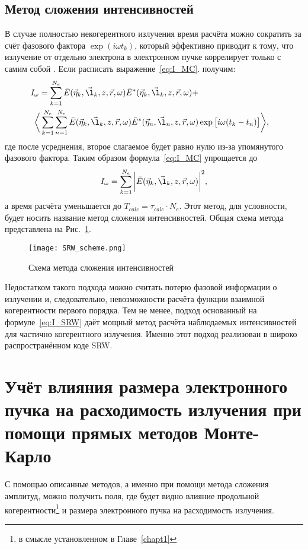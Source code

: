 \subsection{Метод сложения интенсивностей}
В случае полностью некогерентного излучения время расчёта можно сократить за счёт фазового фактора $\exp{(i \omega t_k)}$, который эффективно приводит к тому, что излучение от отдельно электрона в электронном пучке коррелирует только с самим собой \cite{geloni_transverse_2008}. Если расписать выражение~\ref{eq:I_MC}. получим: 
\begin{align}
	I_{\omega} = \sum\limits_{k=1}^{N_e} \bar{E}(\vec{\eta}_k, \vec{\l}_k, z, \vec{r}, \omega)\bar{E}^{*}(\vec{\eta}_k, \vec{\l}_k, z, \vec{r}, \omega) + \cr
	\bigg \langle \sum\limits_{k=1}^{N_e} \sum\limits_{n=1}^{N_e} \bar{E}(\vec{\eta}_k, \vec{\l}_k, z, \vec{r}, \omega)\bar{E}^{*}(\vec{\eta}_n, \vec{\l}_n, z, \vec{r}, \omega) & \exp{\big[i \omega (t_k - t_n)\big]}\bigg \rangle,
	\label{eq:I_SRW_with_explicit_sum} 
\end{align}
где после усреднения, второе слагаемое будет равно нулю из-за упомянутого фазового фактора. Таким образом формула~\ref{eq:I_MC} упрощается до 
\begin{align}
 	I_{\omega} = \sum\limits_{k=1}^{N_e} \bigg|\bar{E}(\vec{\eta}_k, \vec{\l}_k, z, \vec{r}, \omega)\bigg|^2,
 	\label{eq:I_SRW} 
\end{align}
а время расчёта уменьшается до $T_{calc} = \tau_{calc} \cdot N_e$. Этот метод, для условности, будет носить название метод сложения интенсивностей. Общая схема метода представлена на Рис.~\ref{fig:SRW_scheme}.
\begin{figure}[H] 
	\centering 	\texttt{[image: SRW\_scheme.png]}
	\caption{Схема метода сложения интенсивностей}
	\label{fig:SRW_scheme}
\end{figure}
\noindent  Недостатком такого подхода можно считать потерю фазовой информации о излучении и, следовательно, невозможности расчёта функции взаимной когерентности первого порядка. Тем не менее, подход основанный на формуле~\ref{eq:I_SRW} даёт мощный метод расчёта наблюдаемых интенсивностей для частично когерентного излучения. Именно этот подход реализован в широко распространённом коде SRW.
  
\section{Учёт влияния размера электронного пучка на расходимость излучения при помощи прямых методов Монте-Карло}
С помощью описанные методов, а именно при помощи метода сложения амплитуд, можно получить поля, где будет видно влияние продольной когерентности\footnote{в смысле установленном в Главе~\ref{chapt1}} и размера электронного пучка на расходимость излучения.
